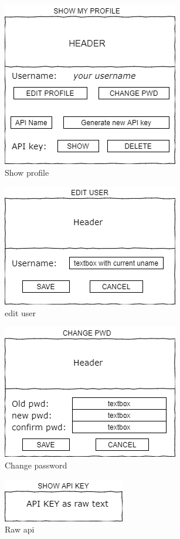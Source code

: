 \documentclass{article}
\begin{document}
\begin{figure}[!h]
    \centering
    \includegraphics{show_profile}
    \caption{Show profile}
    \label{fig:show_profile}
\end{figure}

\begin{figure}[!h]
    \centering
    \includegraphics{edit_user}
    \caption{edit user}
    \label{fig:edit profile}
\end{figure}

\begin{figure}[!h]
    \centering
    \includegraphics{change_password}
    \caption{Change password}
    \label{fig:Change password}
\end{figure}

\begin{figure}[!h]
    \centering
    \includegraphics{api}
    \caption{Raw api}
    \label{fig:raw api}
\end{figure}
\end{document}
